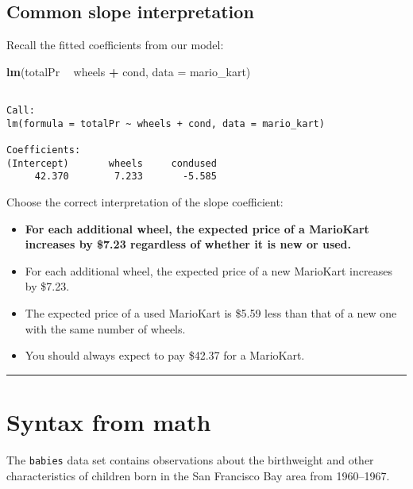 \documentclass[]{book}
\newenvironment{Shaded}{\begin{snugshade}}{\end{snugshade}}
\newcommand{\KeywordTok}[1]{\textcolor[rgb]{0.13,0.29,0.53}{\textbf{#1}}}
\newcommand{\DataTypeTok}[1]{\textcolor[rgb]{0.13,0.29,0.53}{#1}}
\newcommand{\StringTok}[1]{\textcolor[rgb]{0.31,0.60,0.02}{#1}}
\newcommand{\OperatorTok}[1]{\textcolor[rgb]{0.81,0.36,0.00}{\textbf{#1}}}
\newcommand{\NormalTok}[1]{#1}
\begin{document}
\subsection*{Common slope
interpretation}\label{common-slope-interpretation}

Recall the fitted coefficients from our model:

\begin{Shaded}
\begin{Highlighting}[]
\KeywordTok{lm}\NormalTok{(totalPr }\OperatorTok{~}\StringTok{ }\NormalTok{wheels }\OperatorTok{+}\StringTok{ }\NormalTok{cond, }\DataTypeTok{data =}\NormalTok{ mario_kart)}
\end{Highlighting}
\end{Shaded}

\begin{verbatim}

Call:
lm(formula = totalPr ~ wheels + cond, data = mario_kart)

Coefficients:
(Intercept)       wheels     condused  
     42.370        7.233       -5.585  
\end{verbatim}

Choose the correct interpretation of the slope coefficient:

\begin{itemize}
\item
  \textbf{For each additional wheel, the expected price of a MarioKart
  increases by \$7.23 regardless of whether it is new or used.}
\item
  For each additional wheel, the expected price of a new MarioKart
  increases by \$7.23.
\item
  The expected price of a used MarioKart is \$5.59 less than that of a
  new one with the same number of wheels.
\item
  You should always expect to pay \$42.37 for a MarioKart.
\end{itemize}

\begin{center}\rule{0.5\linewidth}{\linethickness}\end{center}

\section{Syntax from math}\label{syntax-from-math}

The \texttt{babies} data set contains observations about the birthweight
and other characteristics of children born in the San Francisco Bay area
from 1960--1967.
\end{document}
